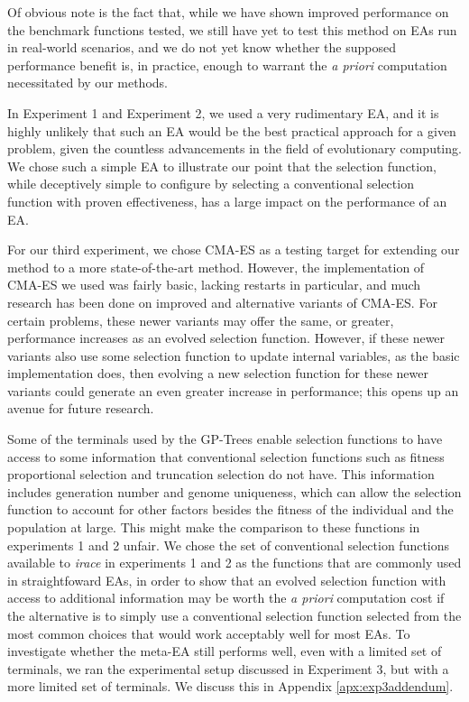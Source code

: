 \documentclass[sigconf]{acmart}
\begin{document}
Of obvious note is the fact that, while we have shown improved performance on the benchmark functions tested, we still have yet to test this method on EAs run in real-world scenarios, and we do not yet know whether the supposed performance benefit is, in practice, enough to warrant the \textit{a priori} computation necessitated by our methods.

In Experiment 1 and Experiment 2, we used a very rudimentary EA, and it is highly unlikely that such an EA would be the best practical approach for a given problem, given the countless advancements in the field of evolutionary computing. We chose such a simple EA to illustrate our point that the selection function, while deceptively simple to configure by selecting a conventional selection function with proven effectiveness, has a large impact on the performance of an EA.

For our third experiment, we chose CMA-ES as a testing target for extending our method to a more state-of-the-art method. However, the implementation of CMA-ES we used was fairly basic, lacking restarts in particular, and much research has been done on improved and alternative variants of CMA-ES. For certain problems, these newer variants may offer the same, or greater, performance increases as an evolved selection function. However, if these newer variants also use some selection function to update internal variables, as the basic implementation does, then evolving a new selection function for these newer variants could generate an even greater increase in performance; this opens up an avenue for future research.

Some of the terminals used by the GP-Trees enable selection functions to have access to some information that conventional selection functions such as fitness proportional selection and truncation selection do not have. This information includes generation number and genome uniqueness, which can allow the selection function to account for other factors besides the fitness of the individual and the population at large. This might make the comparison to these functions in experiments 1 and 2 unfair. We chose the set of conventional selection functions available to \textit{irace} in experiments 1 and 2 as the functions that are commonly used in straightfoward EAs, in order to show that an evolved selection function with access to additional information may be worth the \textit{a priori} computation cost if the alternative is to simply use a conventional selection function selected from the most common choices that would work acceptably well for most EAs. To investigate whether the meta-EA still performs well, even with a limited set of terminals, we ran the experimental setup discussed in Experiment 3, but with a more limited set of terminals. We discuss this in Appendix \ref{apx:exp3addendum}.
\end{document}
